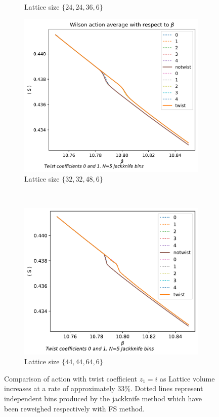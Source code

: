 \documentclass[english,twoside,openright]{UH_TCM_MSc}
\begin{document}
\begin{figure}[htpb]
\begin{subfigure}[t]{0.5\textwidth}
        \caption{Lattice size $\{24,24,36,6\}$}
    \end{subfigure}
    \begin{subfigure}[t]{0.5\textwidth}
        \centering
        \includegraphics[width=\textwidth]{final_plots/32_32_48/action_0-1.pdf}
        \caption{Lattice size $\{32,32,48,6\}$}
    \end{subfigure}%
    ~ 
    \begin{subfigure}[t]{0.5\textwidth}
        \centering
        \includegraphics[width=\textwidth]{final_plots/44_44_64/action_0-1.pdf}
        \caption{Lattice size $\{44,44,64,6\}$}
    \end{subfigure}
    \caption{Comparison of action with twist coefficient $z_1=i$ as Lattice volume increases at a rate of approximately $33$\%. Dotted lines represent independent bins produced by the jackknife method which have been reweighed respectively with FS method.} 
\end{figure}
\end{document}
